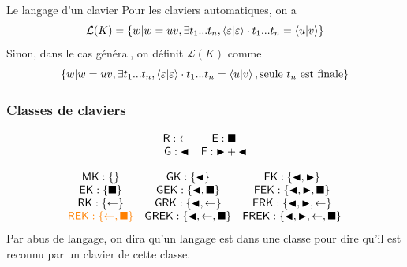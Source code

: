 \documentclass[11pt,french,professionalfonts]{beamer}
\renewcommand{\L}{\mathcal{L}}
\begin{document}
\begin{frame}{Le langage d'un clavier}
	Pour les claviers automatiques, on a \[\L(K) = \{w | w =uv, \exists t_1...t_n, \conf{\varepsilon}{\varepsilon}\cdot t_1...t_n = \conf{u}{v}\}\] \pause
    Sinon, dans le cas général, on définit $\L(K)$ comme \[\{w | w =uv, \exists t_1...t_n, \conf{\varepsilon}{\varepsilon}\cdot t_1...t_n = \conf{u}{v}, \mathrm{seule~} t_n \mathrm{~est~finale}\}\]
\end{frame}


\begin{frame}
	\frametitle{Classes de claviers}
	\[
	 \begin{array}{cc}
		\mathsf{R}:  \retour & \mathsf{E}:  \entree \\
        \mathsf{G}:  \gauche & \mathsf{F}:  \droite + \gauche \\
	 \end{array}
	\]

	\[
		\begin{array}{ccc}
			\MK : \{\} & \GK : \{\gauche\} & \FK :\{\gauche,\droite\} \\
			\EK : \{\entree\} & \GEK : \{\gauche,\entree\} & \FEK :\{\gauche,\droite,\entree\} \\
			\RK : \{\retour\} & \GRK : \{\gauche,\retour\} & \FRK :\{\gauche,\droite,\retour\} \\
			\color{orange}{\REK : \{\retour, \entree\}} & \GREK : \{\gauche,\retour,\entree\} & \FREK :\{\gauche,\droite,\retour,\entree\} \\
		\end{array}
	\]
	\small{Par abus de langage, on dira qu'un langage est dans une classe pour dire qu'il est reconnu par un clavier de cette classe.}
 \end{frame}
\end{document}
